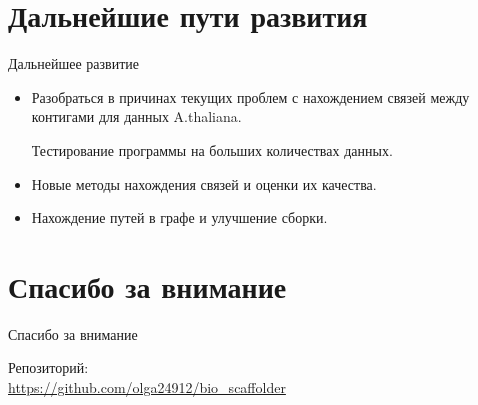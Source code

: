 \documentclass{beamer}
\newcommand{\cimg}[2]{%
	\begin{center}%
		\ifthenelse{\equal{#2}{}}{%
			\texttt{[image: \#1]}
		}{%
			\texttt{[image: \#1]}
		}%
	\end{center}%
}
\begin{document}
\section{Дальнейшие пути развития}
\begin{frame}[t]{Дальнейшее развитие}
\begin{itemize}
\item Разобраться в причинах текущих 
проблем с нахождением связей между 
контигами для данных A.thaliana.  

Тестирование программы на больших 
количествах данных. 

\cimg{athaliana.jpg}{0.20}
\item %
Новые методы нахождения связей и оценки их качества. 
\item Нахождение путей в графе и улучшение сборки. 
\end{itemize}
\end{frame}

\section{Спасибо за внимание}
\begin{frame}{Спасибо за внимание}
    \begin{center}
        Репозиторий: \\ \url{https://github.com/olga24912/bio_scaffolder}
    \end{center}
\end{frame}
\end{document}
